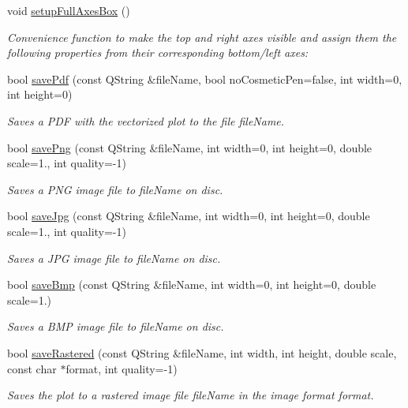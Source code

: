 \begin{DoxyCompactItemize}
void \hyperlink{a00116_ad27d34bcc9e68b5482d128e2f1e38f55}{setup\+Full\+Axes\+Box} ()
\begin{DoxyCompactList}\small\item\em Convenience function to make the top and right axes visible and assign them the following properties from their corresponding bottom/left axes\+: \end{DoxyCompactList}\item 
bool \hyperlink{a00116_a84e33ad7492180f20ff520e557ed102d}{save\+Pdf} (const Q\+String \&file\+Name, bool no\+Cosmetic\+Pen=false, int width=0, int height=0)
\begin{DoxyCompactList}\small\item\em Saves a P\+D\+F with the vectorized plot to the file {\itshape file\+Name}. \end{DoxyCompactList}\item 
bool \hyperlink{a00116_a7636261aff1f6d25c9da749ece3fc8b8}{save\+Png} (const Q\+String \&file\+Name, int width=0, int height=0, double scale=1., int quality=-\/1)
\begin{DoxyCompactList}\small\item\em Saves a P\+N\+G image file to {\itshape file\+Name} on disc. \end{DoxyCompactList}\item 
bool \hyperlink{a00116_a490c722092d1771e8ce4a7a73dfd84ab}{save\+Jpg} (const Q\+String \&file\+Name, int width=0, int height=0, double scale=1., int quality=-\/1)
\begin{DoxyCompactList}\small\item\em Saves a J\+P\+G image file to {\itshape file\+Name} on disc. \end{DoxyCompactList}\item 
bool \hyperlink{a00116_a6629d9e8e6da4bf18055ee0257fdce9a}{save\+Bmp} (const Q\+String \&file\+Name, int width=0, int height=0, double scale=1.)
\begin{DoxyCompactList}\small\item\em Saves a B\+M\+P image file to {\itshape file\+Name} on disc. \end{DoxyCompactList}\item 
bool \hyperlink{a00116_ab528b84cf92baabe29b1d0ef2f77c93e}{save\+Rastered} (const Q\+String \&file\+Name, int width, int height, double scale, const char $\ast$format, int quality=-\/1)
\begin{DoxyCompactList}\small\item\em Saves the plot to a rastered image file {\itshape file\+Name} in the image format {\itshape format}. \end{DoxyCompactList}\item 

\end{DoxyCompactItemize}
